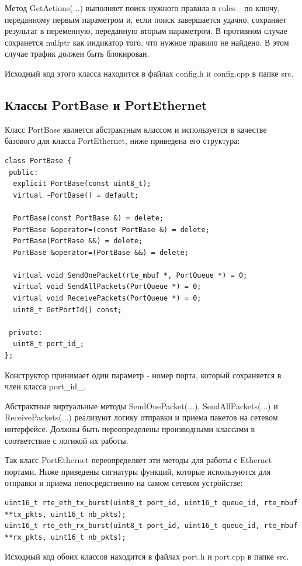 Метод GetActions(...) выполняет поиск нужного правила в rules\_ по ключу, переданному первым параметром и, если поиск завершается удачно, сохраняет результат в переменную, переданную вторым параметром. В противном случае сохранется nullptr как индикатор того, что нужное правило не найдено. В этом случае трафик должен быть блокирован.

Исходный код этого класса находится в файлах config.h и config.cpp в папке src.

\subsection{Классы PortBase и PortEthernet}
Класс PortBase является абстрактным классом и используется в качестве базового для класса PortEthernet, ниже приведена его структура:
\begin{lstlisting}
class PortBase {
 public:
  explicit PortBase(const uint8_t);
  virtual ~PortBase() = default;

  PortBase(const PortBase &) = delete;
  PortBase &operator=(const PortBase &) = delete;
  PortBase(PortBase &&) = delete;
  PortBase &operator=(PortBase &&) = delete;

  virtual void SendOnePacket(rte_mbuf *, PortQueue *) = 0;
  virtual void SendAllPackets(PortQueue *) = 0;
  virtual void ReceivePackets(PortQueue *) = 0;
  uint8_t GetPortId() const;

 private:
  uint8_t port_id_;
};
\end{lstlisting}

Конструктор принимает один параметр - номер порта, который сохраняется в член класса port\_id\_.

Абстрактные виртуальные методы SendOnePacket(...), SendAllPackets(...) и ReceivePackets(...) реализуют логику отправки и приема пакетов на сетевом интерфейсе. Должны быть переопределены производными классами в соответствие с логикой их работы.

Так класс PortEthernet переопределяет эти методы для работы с Ethernet портами. Ниже приведены сигнатуры функций, которые используются для отправки и приема непосредственно на самом сетевом устройстве:
\begin{lstlisting}
uint16_t rte_eth_tx_burst(uint8_t port_id, uint16_t queue_id, rte_mbuf **tx_pkts, uint16_t nb_pkts);
uint16_t rte_eth_rx_burst(uint8_t port_id, uint16_t queue_id, rte_mbuf **rx_pkts, uint16_t nb_pkts);
\end{lstlisting}

Исходный код обоих классов находится в файлах port.h и port.cpp в папке src.

